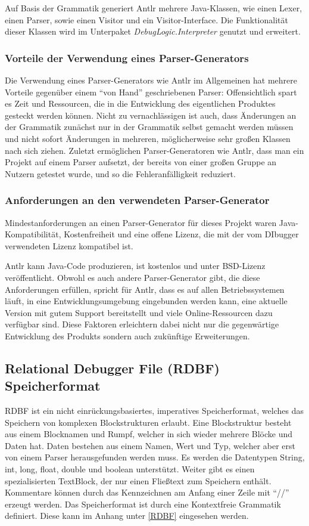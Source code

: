 \documentclass[parskip=full]{scrartcl}
\begin{document}
Auf Basis der Grammatik generiert Antlr mehrere Java-Klassen, wie einen Lexer, einen Parser, sowie einen Visitor und ein Visitor-Interface. Die Funktionalität dieser Klassen wird im Unterpaket \textit{DebugLogic.Interpreter} genutzt und erweitert.

\subsubsection{Vorteile der Verwendung eines Parser-Generators}
Die Verwendung eines Parser-Generators wie Antlr im Allgemeinen hat mehrere Vorteile gegenüber einem “von Hand” geschriebenen Parser: Offensichtlich spart es Zeit und Ressourcen, die in die Entwicklung des eigentlichen Produktes gesteckt werden können. Nicht zu vernachlässigen ist auch, dass Änderungen an der Grammatik zunächst nur in der Grammatik selbst gemacht werden müssen und nicht sofort Änderungen in mehreren, möglicherweise sehr großen Klassen nach sich ziehen. Zuletzt ermöglichen Parser-Generatoren wie Antlr, dass man ein Projekt auf einem Parser aufsetzt, der bereits von einer großen Gruppe an Nutzern getestet wurde, und so die Fehleranfälligkeit reduziert.


\subsubsection{Anforderungen an den verwendeten Parser-Generator}

Mindestanforderungen an einen Parser-Generator für dieses Projekt waren Java-Kompatibilität, Kostenfreiheit und eine offene Lizenz, die mit der vom DIbugger verwendeten Lizenz kompatibel ist.

Antlr kann Java-Code produzieren, ist kostenlos und unter BSD-Lizenz veröffentlicht.
Obwohl es auch andere Parser-Generator gibt, die diese Anforderungen erfüllen, spricht für Antlr, dass es auf allen Betriebssystemen läuft, in eine Entwicklungsumgebung eingebunden werden kann, eine aktuelle Version mit gutem Support bereitstellt und viele Online-Ressourcen dazu verfügbar sind.
Diese Faktoren erleichtern dabei nicht nur die gegenwärtige Entwicklung des Produkts sondern auch zukünftige Erweiterungen.

\subsection{Relational Debugger File (RDBF) Speicherformat}
RDBF ist ein nicht einrückungsbasiertes, imperatives Speicherformat, welches das Speichern von komplexen Blockstrukturen erlaubt.
Eine Blockstruktur besteht aus einem Blocknamen und Rumpf, welcher in sich wieder mehrere Blöcke und Daten hat.
Daten bestehen aus einem Namen, Wert und Typ, welcher aber erst von einem Parser herausgefunden werden muss.
Es werden die Datentypen String, int, long, float, double und boolean unterstützt.
Weiter gibt es einen spezialisierten TextBlock, der nur einen Fließtext zum Speichern enthält.
Kommentare können durch das Kennzeichnen am Anfang einer Zeile mit \enquote{//} erzeugt werden.
Das Speicherformat ist durch eine Kontextfreie Grammatik definiert. Diese kann im Anhang unter \ref{RDBF} eingesehen werden. 
\end{document}
